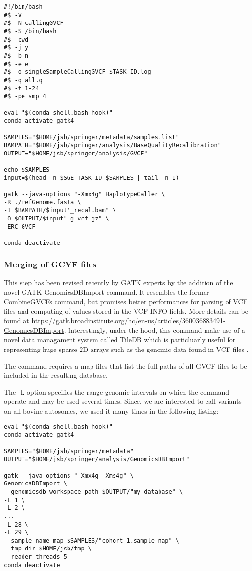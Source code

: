 \begin{verbatim}
#!/bin/bash
#$ -V
#$ -N callingGVCF
#$ -S /bin/bash
#$ -cwd
#$ -j y
#$ -b n
#$ -e e
#$ -o singleSampleCallingGVCF_$TASK_ID.log
#$ -q all.q
#$ -t 1-24
#$ -pe smp 4

eval "$(conda shell.bash hook)"
conda activate gatk4

SAMPLES="$HOME/jsb/springer/metadata/samples.list"
BAMPATH="$HOME/jsb/springer/analysis/BaseQualityRecalibration"
OUTPUT="$HOME/jsb/springer/analysis/GVCF"

echo $SAMPLES
input=$(head -n $SGE_TASK_ID $SAMPLES | tail -n 1)

gatk --java-options "-Xmx4g" HaplotypeCaller \
-R ./refGenome.fasta \
-I $BAMPATH/$input"_recal.bam" \
-O $OUTPUT/$input".g.vcf.gz" \
-ERC GVCF

conda deactivate
\end{verbatim}





\subsubsection{Merging of GCVF files}

This step has been revised recently by GATK experts by the addition of the novel GATK GenomicsDBImport command. It resembles the former CombineGVCFs command, but promises better performances for parsing of VCF files and computing of values stored in the VCF INFO fields. More details can be found at \href{https://gatk.broadinstitute.org/hc/en-us/articles/360036883491-GenomicsDBImport}{https://gatk.broadinstitute.org/hc/en-us/articles/360036883491-GenomicsDBImport}. Interestingly, under the hood, this command make use of a novel data managament system called  TileDB which is particluarly useful for representing huge sparse 2D arrays such as the genomic data found in VCF files \cite{Papadopoulos2016}. 


The command requires a map files that list the full paths of all GVCF files to be included in the resulting database. 

The -L option specifies the range genomic intervals on which the command operate and may be used several times. Since, we are interested to call variants on all bovine autosomes, we used it many times in the following listing:


\begin{verbatim}
eval "$(conda shell.bash hook)"
conda activate gatk4

SAMPLES="$HOME/jsb/springer/metadata"
OUTPUT="$HOME/jsb/springer/analysis/GenomicsDBImport"

gatk --java-options "-Xmx4g -Xms4g" \
GenomicsDBImport \
--genomicsdb-workspace-path $OUTPUT/"my_database" \
-L 1 \
-L 2 \
...
-L 28 \
-L 29 \
--sample-name-map $SAMPLES/"cohort_1.sample_map" \
--tmp-dir $HOME/jsb/tmp \
--reader-threads 5
conda deactivate

\end{verbatim}


